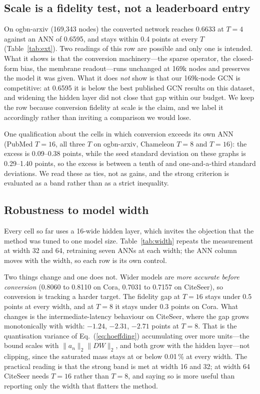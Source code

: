 \documentclass[10pt,twocolumn]{article}
\newcommand{\anorm}{\lVert a_{n}\rVert_{2}}
\newcommand{\tabref}[1]{Table~\ref{#1}}
\newcommand{\eqnref}[1]{Eq.~(\ref{#1})}
\begin{document}
\subsection{Scale is a fidelity test, not a leaderboard entry}
\label{sec:scale}

On ogbn-arxiv (169{,}343 nodes) the converted network reaches 0.6633 at $T=4$ against an ANN of
0.6595, and stays within 0.4 points at every $T$ (\tabref{tab:ext}). Two readings of this row are
possible and only one is intended. What it shows is that the conversion machinery---the sparse
operator, the closed-form bias, the membrane readout---runs unchanged at 169k nodes and preserves
the model it was given. What it does \emph{not} show is that our 169k-node GCN is competitive: at
0.6595 it is below the best published GCN results on this dataset, and widening the hidden layer
did not close that gap within our budget. We keep the row because conversion fidelity at scale is
the claim, and we label it accordingly rather than inviting a comparison we would lose.

One qualification about the cells in which conversion exceeds its own ANN (PubMed $T=16$, all
three $T$ on ogbn-arxiv, Chameleon $T=8$ and $T=16$): the excess is 0.09--0.38 points, while the
seed standard deviation on these graphs is 0.29--1.40 points, so the excess is between a tenth of
and one-and-a-third standard deviations. We read these as ties, not as gains, and the strong
criterion is evaluated as a band rather than as a strict inequality.

\subsection{Robustness to model width}
\label{sec:width}

Every cell so far uses a 16-wide hidden layer, which invites the objection that the method was tuned
to one model size. \tabref{tab:width} repeats the measurement at width 32 and 64, retraining seven
ANNs at each width; the ANN column moves with the width, so each row is its own control.

Two things change and one does not. Wider models are \emph{more accurate before conversion}
(0.8060 to 0.8110 on Cora, 0.7031 to 0.7157 on CiteSeer), so conversion is tracking a harder target.
The fidelity gap at $T=16$ stays under 0.5 points at every width, and at $T=8$ it stays under 0.3
points on Cora. What changes is the intermediate-latency behaviour on CiteSeer, where the gap grows
monotonically with width: $-1.24$, $-2.31$, $-2.71$ points at $T=8$. That is the quantisation
variance of \eqnref{eq:hoeffding} accumulating over more units---the bound scales with
$\anorm\lVert DW\rVert_{2}$, and both grow with the hidden layer---not clipping, since the saturated
mass stays at or below 0.01\,\% at every width. The practical reading is that the strong band is met
at width 16 and 32; at width 64 CiteSeer needs $T=16$ rather than $T=8$, and saying so is more useful
than reporting only the width that flatters the method.
\end{document}
